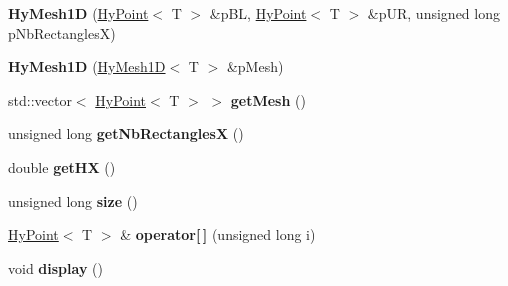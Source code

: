 \begin{DoxyCompactItemize}
\item 
\hypertarget{classHyMesh1D_a7bfabb4cb61760a439ffd07c42150c53}{
{\bfseries HyMesh1D} (\hyperlink{classHyPoint}{HyPoint}$<$ T $>$ \&pBL, \hyperlink{classHyPoint}{HyPoint}$<$ T $>$ \&pUR, unsigned long pNbRectanglesX)}
\label{classHyMesh1D_a7bfabb4cb61760a439ffd07c42150c53}

\item 
\hypertarget{classHyMesh1D_aba7a70a7db8172726f77eca7d72a5b97}{
{\bfseries HyMesh1D} (\hyperlink{classHyMesh1D}{HyMesh1D}$<$ T $>$ \&pMesh)}
\label{classHyMesh1D_aba7a70a7db8172726f77eca7d72a5b97}

\item 
\hypertarget{classHyMesh1D_aae6435a1ffbdd95de5b67620eec79e81}{
std::vector$<$ \hyperlink{classHyPoint}{HyPoint}$<$ T $>$ $>$ {\bfseries getMesh} ()}
\label{classHyMesh1D_aae6435a1ffbdd95de5b67620eec79e81}

\item 
\hypertarget{classHyMesh1D_a7c6d73f2ca7f4b92fad7aed304e5fb62}{
unsigned long {\bfseries getNbRectanglesX} ()}
\label{classHyMesh1D_a7c6d73f2ca7f4b92fad7aed304e5fb62}

\item 
\hypertarget{classHyMesh1D_a2c34467214ad7b0bf1070f4e6e90e446}{
double {\bfseries getHX} ()}
\label{classHyMesh1D_a2c34467214ad7b0bf1070f4e6e90e446}

\item 
\hypertarget{classHyMesh1D_a4fbd824ebe60ba0c844441e8de7e53b0}{
unsigned long {\bfseries size} ()}
\label{classHyMesh1D_a4fbd824ebe60ba0c844441e8de7e53b0}

\item 
\hypertarget{classHyMesh1D_abb7bc7c5d83046745958a8b2f0accd59}{
\hyperlink{classHyPoint}{HyPoint}$<$ T $>$ \& {\bfseries operator\mbox{[}$\,$\mbox{]}} (unsigned long i)}
\label{classHyMesh1D_abb7bc7c5d83046745958a8b2f0accd59}

\item 
\hypertarget{classHyMesh1D_a3a5fd4c05d03c6e45293a34a0d112114}{
void {\bfseries display} ()}
\label{classHyMesh1D_a3a5fd4c05d03c6e45293a34a0d112114}

\end{DoxyCompactItemize}
